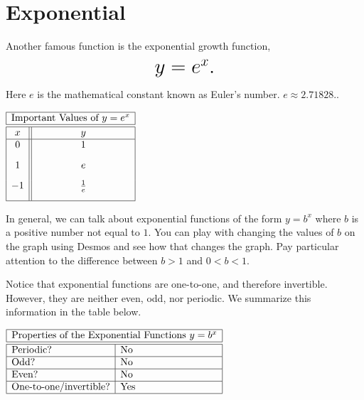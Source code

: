 \documentclass[nooutcomes]{ximera}
\begin{document}
\newpage


\section{Exponential}
Another famous function is the exponential growth function, $$ \mbox{\huge $y=e^{x}.$}$$ 

Here $e$ is the mathematical constant known as Euler's number.  $e \approx 2.71828 .$.

\begin{image}
\end{image}

\begin{center}
\(
\begin{array}{ |c || c|  }
 \hline
 \multicolumn{2}{|c|}{\text{\normalfont Important Values of } y=e^x} \\
\hline
 \hline
 x & y\\
 \hline
 0&1\\[2ex]
 1&e\\[2ex]
 -1&\frac{1}{e}\\[2ex]
 \hline
\end{array}
\)
\end{center}

In general, we can talk about exponential functions of the form $y=b^{x}$ where $b$ is a positive number not equal to $1$.  You can play with changing the values of $b$ on the graph using Desmos and see how that changes the graph.  Pay particular attention to the difference between $b>1$ and $0<b<1$.

\begin{center}  
\end{center}

Notice that exponential functions are one-to-one, and therefore invertible. However, they are neither even, odd, nor periodic. We summarize this information in the table below.

\begin{center}
$
\begin{array}{|l|l|}
 \hline
 \multicolumn{2}{|c|}{\text{\normalfont Properties of the Exponential Functions } y=b^x} \\
\hline
 \hline
\text{Periodic?} & \text{No} \\ \hline
\text{Odd?} & \text{No} \\ \hline
\text{Even?} & \text{No} \\ \hline
\text{One-to-one/invertible?} & \text{Yes} \\ \hline
\end{array}
$
\end{center}
\end{document}
